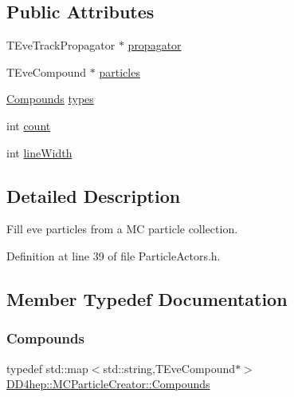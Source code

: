 \subsection*{Public Attributes}
\begin{DoxyCompactItemize}
\item 
T\+Eve\+Track\+Propagator $\ast$ \hyperlink{struct_d_d4hep_1_1_m_c_particle_creator_a536aef5f2059670db5b8dc81de6559a4}{propagator}
\item 
T\+Eve\+Compound $\ast$ \hyperlink{struct_d_d4hep_1_1_m_c_particle_creator_aee3566635d042c98a8f849ff6213873c}{particles}
\item 
\hyperlink{struct_d_d4hep_1_1_m_c_particle_creator_a803ff0bb27e3c5cd40daf4d253eb2b62}{Compounds} \hyperlink{struct_d_d4hep_1_1_m_c_particle_creator_a622e212ec5e4471e2ae306e44839a69c}{types}
\item 
int \hyperlink{struct_d_d4hep_1_1_m_c_particle_creator_a91d20c4304e3781732682f75271f45ef}{count}
\item 
int \hyperlink{struct_d_d4hep_1_1_m_c_particle_creator_a105c9287f1f91d862a3d77d97be0557d}{line\+Width}
\end{DoxyCompactItemize}


\subsection{Detailed Description}
Fill eve particles from a MC particle collection. 

Definition at line 39 of file Particle\+Actors.\+h.



\subsection{Member Typedef Documentation}
\hypertarget{struct_d_d4hep_1_1_m_c_particle_creator_a803ff0bb27e3c5cd40daf4d253eb2b62}{}\label{struct_d_d4hep_1_1_m_c_particle_creator_a803ff0bb27e3c5cd40daf4d253eb2b62} 
\subsubsection{\texorpdfstring{Compounds}{Compounds}}
{\footnotesize\ttfamily typedef std\+::map$<$std\+::string,T\+Eve\+Compound$\ast$$>$ \hyperlink{struct_d_d4hep_1_1_m_c_particle_creator_a803ff0bb27e3c5cd40daf4d253eb2b62}{D\+D4hep\+::\+M\+C\+Particle\+Creator\+::\+Compounds}}



